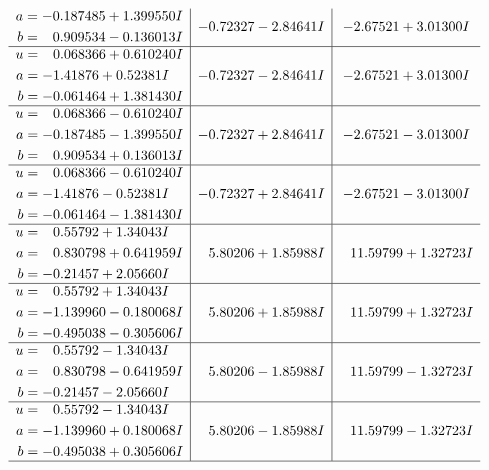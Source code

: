 \documentclass[1p]{elsarticle_modified}
\theoremstyle{definition}
\begin{document}
$$\begin{array}{c|c|c}
\begin{aligned}
a &= -0.187485 + 1.399550 I \\
b &= \phantom{-}0.909534 - 0.136013 I\end{aligned}
 & -0.72327 - 2.84641 I & -2.67521 + 3.01300 I \\ \hline\begin{aligned}
u &= \phantom{-}0.068366 + 0.610240 I \\
a &= -1.41876 + 0.52381 I \\
b &= -0.061464 + 1.381430 I\end{aligned}
 & -0.72327 - 2.84641 I & -2.67521 + 3.01300 I \\ \hline\begin{aligned}
u &= \phantom{-}0.068366 - 0.610240 I \\
a &= -0.187485 - 1.399550 I \\
b &= \phantom{-}0.909534 + 0.136013 I\end{aligned}
 & -0.72327 + 2.84641 I & -2.67521 - 3.01300 I \\ \hline\begin{aligned}
u &= \phantom{-}0.068366 - 0.610240 I \\
a &= -1.41876 - 0.52381 I \\
b &= -0.061464 - 1.381430 I\end{aligned}
 & -0.72327 + 2.84641 I & -2.67521 - 3.01300 I \\ \hline\begin{aligned}
u &= \phantom{-}0.55792 + 1.34043 I \\
a &= \phantom{-}0.830798 + 0.641959 I \\
b &= -0.21457 + 2.05660 I\end{aligned}
 & \phantom{-}5.80206 + 1.85988 I & \phantom{-}11.59799 + 1.32723 I \\ \hline\begin{aligned}
u &= \phantom{-}0.55792 + 1.34043 I \\
a &= -1.139960 - 0.180068 I \\
b &= -0.495038 - 0.305606 I\end{aligned}
 & \phantom{-}5.80206 + 1.85988 I & \phantom{-}11.59799 + 1.32723 I \\ \hline\begin{aligned}
u &= \phantom{-}0.55792 - 1.34043 I \\
a &= \phantom{-}0.830798 - 0.641959 I \\
b &= -0.21457 - 2.05660 I\end{aligned}
 & \phantom{-}5.80206 - 1.85988 I & \phantom{-}11.59799 - 1.32723 I \\ \hline\begin{aligned}
u &= \phantom{-}0.55792 - 1.34043 I \\
a &= -1.139960 + 0.180068 I \\
b &= -0.495038 + 0.305606 I\end{aligned}
 & \phantom{-}5.80206 - 1.85988 I & \phantom{-}11.59799 - 1.32723 I\\
 \hline 
 \end{array}$$\newpage\newpage\renewcommand{\arraystretch}{1}
\end{document}

